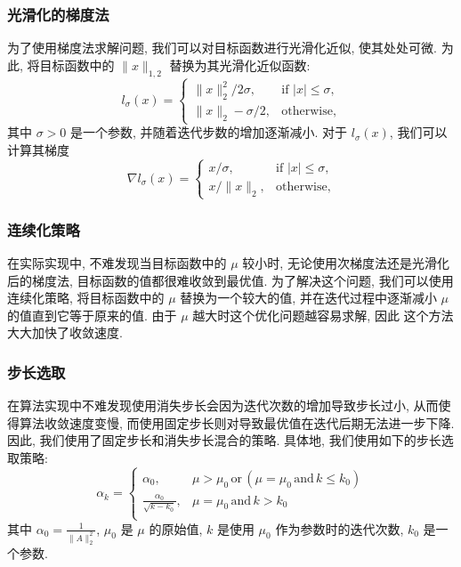 \documentclass{article}
\begin{document}
\subsubsection{光滑化的梯度法}
为了使用梯度法求解问题, 我们可以对目标函数进行光滑化近似, 使其处处可微. 为此, 将目标函数中的 $\|x\|_{1,2}$ 替换为其光滑化近似函数:
\begin{equation*}
    l_\sigma(x) =
    \begin{cases}
        \|x\|_2^2 / 2\sigma, &\text{if } |x| \leq \sigma, \\
        \|x\|_2 - \sigma / 2, &\text{otherwise},
    \end{cases}
\end{equation*}
其中 $\sigma > 0$ 是一个参数, 并随着迭代步数的增加逐渐减小. 对于 $l_\sigma(x)$, 我们可以计算其梯度
\begin{equation*}
    \nabla l_\sigma(x) =
    \begin{cases}
        x / \sigma, &\text{if } |x| \leq \sigma, \\
        x / \|x\|_2, &\text{otherwise},
    \end{cases}
\end{equation*}

\subsubsection{连续化策略}
在实际实现中, 不难发现当目标函数中的 $\mu$ 较小时, 无论使用次梯度法还是光滑化后的梯度法, 目标函数的值都很难收敛到最优值. 为了解决这个问题, 我们可以使用连续化策略, 将目标函数中的 $\mu$ 替换为一个较大的值, 并在迭代过程中逐渐减小 $\mu$ 的值直到它等于原来的值. 由于 $\mu$ 越大时这个优化问题越容易求解, 因此 这个方法大大加快了收敛速度.

\subsubsection{步长选取}
在算法实现中不难发现使用消失步长会因为迭代次数的增加导致步长过小, 从而使得算法收敛速度变慢, 而使用固定步长则对导致最优值在迭代后期无法进一步下降. 因此, 我们使用了固定步长和消失步长混合的策略. 具体地, 我们使用如下的步长选取策略:
\begin{equation*}
    \alpha_k =
    \begin{cases}
        \alpha_0, & \mu > \mu_0\, \text{or}\, (\mu=\mu_0\, \text{and}\, k \le k_0)\\
        \frac{\alpha_0}{\sqrt{k-k_0}}, & \mu = \mu_0\,\text{and}\, k > k_0\\
    \end{cases}
\end{equation*}
其中 $\alpha_0 = \frac{1}{\|A\|_2^2}$, $\mu_0$ 是 $\mu$ 的原始值, $k$ 是使用 $\mu_0$ 作为参数时的迭代次数, $k_0$ 是一个参数.
\end{document}
